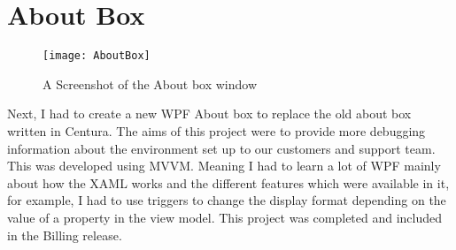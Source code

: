 \section{About Box}{
		\begin{figure}
		\centering
		\texttt{[image: AboutBox]}
		\caption{A Screenshot of the About box window}
		\label{fig:AboutBox}
	\end{figure}
	Next, I had to create a new WPF About box to replace the old about box written in Centura. The aims of this project were to provide more debugging information about the environment set up to our customers and support team. This was developed using MVVM. Meaning I had to learn a lot of WPF mainly about how the XAML works and the different features which were available in it, for example, I had to use triggers to change the display format depending on the value of a property in the view model. This project was completed and included in the Billing release.
}
